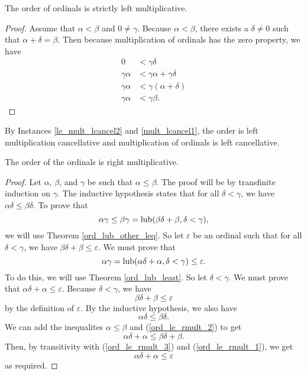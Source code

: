 \documentclass[../../math.tex]{subfiles}
\begin{document}
\begin{instance}
    The order of ordinals is strictly left multiplicative.
\end{instance}
\begin{proof}
    Assume that $\alpha < \beta$ and $0 \neq \gamma$.  Because $\alpha < \beta$,
    there exists a $\delta \neq 0$ such that $\alpha + \delta = \beta$.  Then
    because multiplication of ordinals has the zero property, we have
    \begin{align*}
        0 &< \gamma\delta \\
        \gamma\alpha &< \gamma\alpha + \gamma\delta \\
        \gamma\alpha &< \gamma(\alpha + \delta) \\
        \gamma\alpha &< \gamma\beta.
    \end{align*}
\end{proof}

By Instances \ref{le_mult_lcancel2} and \ref{mult_lcancel1}, the order is left
multiplication cancellative and multiplication of ordinals is left cancellative.

\begin{instance}
    The order of the ordinals is right multiplicative.
\end{instance}
\begin{proof}
    Let $\alpha$, $\beta$, and $\gamma$ be such that $\alpha \leq \beta$.  The
    proof will be by transfinite induction on $\gamma$.  The inductive
    hypothesis states that for all $\delta < \gamma$, we have $\alpha \delta
    \leq \beta \delta$.  To prove that
    \[
        \alpha \gamma \leq \beta\gamma
        = \operatorname{lub}(\beta\delta + \beta, \delta < \gamma),
    \]
    we will use Theorem \ref{ord_lub_other_leq}.  So let $\varepsilon$ be an
    ordinal such that for all $\delta < \gamma$, we have $\beta \delta + \beta
    \leq \varepsilon$.  We must prove that
    \[
        \alpha\gamma = \operatorname{lub}(\alpha \delta + \alpha, \delta < \gamma)
        \leq \varepsilon.
    \]
    To do this, we will use Theorem \ref{ord_lub_least}.  So let $\delta <
    \gamma$.  We must prove that $\alpha\delta + \alpha \leq \varepsilon$.
    Because $\delta < \gamma$, we have
    \begin{equation} \label{ord_le_rmult_1}
        \beta\delta + \beta \leq \varepsilon
    \end{equation}
    by the definition of $\varepsilon$.  By the inductive hypothesis, we also
    have
    \begin{equation} \label{ord_le_rmult_2}
        \alpha\delta \leq \beta\delta.
    \end{equation}
    We can add the inequalites $\alpha \leq \beta$ and (\ref{ord_le_rmult_2}) to
    get
    \begin{equation} \label{ord_le_rmult_3}
        \alpha\delta + \alpha \leq \beta\delta + \beta.
    \end{equation}
    Then, by transitivity with (\ref{ord_le_rmult_3}) and
    (\ref{ord_le_rmult_1}), we get
    \[
        \alpha\delta + \alpha \leq \varepsilon
    \]
    as required.
\end{proof}
\end{document}
